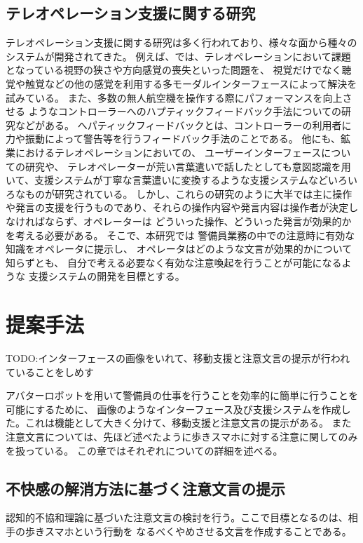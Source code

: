 \documentclass[11pt,a4j]{jreport}
\begin{document}
\section{テレオペレーション支援に関する研究}
テレオペレーション支援に関する研究は多く行われており、様々な面から種々のシステムが開発されてきた。
例えば、\cite{chen2007human,triantafyllidis2020study}では、テレオペレーションにおいて課題となっている視野の狭さや方向感覚の喪失といった問題を、
視覚だけでなく聴覚や触覚などの他の感覚を利用する多モーダルインターフェースによって解決を試みている。
また、多数の無人航空機を操作する際にパフォーマンスを向上させる
ようなコントローラーへのハプティックフィードバック手法についての研究\cite{son2011measuring}などがある。
へパティックフィードバックとは、コントローラーの利用者に力や振動によって警告等を行うフィードバック手法のことである。
他にも、鉱業におけるテレオペレーションにおいての、
ユーザーインターフェースについての研究\cite{hainsworth2001teleoperation}や、
テレオペレーターが荒い言葉遣いで話したとしても意図認識を用いて、支援システムが丁寧な言葉遣いに変換するような支援システム\cite{Daneshmand2023}などいろいろなものが研究されている。
しかし、これらの研究のように大半では主に操作や発言の支援を行うものであり、それらの操作内容や発言内容は操作者が決定しなければならず、オペレーターは
どういった操作、どういった発言が効果的かを考える必要がある。
そこで、本研究では
警備員業務の中での注意時に有効な知識をオペレータに提示し、
オペレータはどのような文言が効果的かについて知らずとも、
自分で考える必要なく有効な注意喚起を行うことが可能になるような
支援システムの開発を目標とする。



\chapter{提案手法}

TODO:インターフェースの画像をいれて、移動支援と注意文言の提示が行われていることをしめす

アバターロボットを用いて警備員の仕事を行うことを効率的に簡単に行うことを可能にするために、
画像のようなインターフェース及び支援システムを作成した。これは機能として大きく分けて、移動支援と注意文言の提示がある。
また注意文言については、先ほど述べたように歩きスマホに対する注意に関してのみを扱っている。
この章ではそれぞれについての詳細を述べる。

\section{不快感の解消方法に基づく注意文言の提示}
認知的不協和理論に基づいた注意文言の検討を行う。ここで目標となるのは、相手の歩きスマホという行動を
なるべくやめさせる文言を作成することである。
\end{document}
